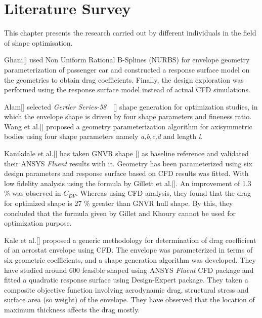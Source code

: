 
\chapter{Literature Survey}
\label{literature}
This chapter presents the research carried out by different individuals in the field of shape optimisation.

Ghani[] used Non Uniform Rational B-Splines (NURBS) for envelope geometry parameterization of passenger car and constructed a response surface model on the geometries to obtain drag coefficients. Finally, the design exploration was performed using the response surface model instead of actual CFD simulations.

Alam[] selected \textit{Gertler Series-58} $ \; $ [] shape generation for optimization studies, in which the envelope shape is driven by four shape parameters and fineness ratio. Wang et al.[] proposed a geometry parameterization algorithm for axisymmetric bodies using four shape parameters namely \textit{a,b,c,d} and length \textit{l}.

Kanikdale et al.[] has taken GNVR shape []  as baseline reference and validated their ANSYS\textsuperscript{\textregistered} \textit{Fluent} results with it. Geometry has been parameterized using six design parameters and response surface based on CFD results was fitted. With low fidelity analysis using the formula by Gillett et al.[]. An improvement of 1.3 \% was observed in $ C_{DV} $. Whereas using CFD analysis, they found that the drag for optimized shape is 27 \% greater than GNVR hull shape. By this, they concluded that the formula given by Gillet and Khoury cannot be used for optimization purpose.

Kale et al.[] proposed a generic methodology for determination of drag coefficient of an aerostat envelope using CFD. The envelope was parameterized in terms of six geometric coefficients, and a shape generation algorithm was developed. They have studied around 600 feasible shaped using ANSYS\textsuperscript{\textregistered} \textit{Fluent} CFD package and fitted a quadratic response surface using Design-Expert package. They taken a composite objective function involving aerodynamic drag, structural stress and surface area (so weight) of the envelope. They have observed that the location of maximum thickness affects the drag mostly. 

